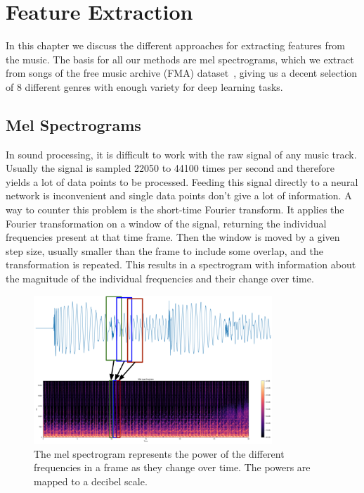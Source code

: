 \chapter{Feature Extraction}\label{ch:extraction}
    In this chapter we discuss the different approaches for extracting features from the music. 
    The basis for all our methods are mel spectrograms, which we extract from songs of the free music archive (FMA) dataset~\cite{FMA}, giving us a decent selection of 8 different genres with enough variety for deep learning tasks.

\section{Mel Spectrograms}
    In sound processing, it is difficult to work with the raw signal of any music track.
    Usually the signal is sampled 22050 to 44100 times per second and therefore yields a lot of data points to be processed. 
    Feeding this signal directly to a neural network is inconvenient and single data points don't give a lot of information.
    A way to counter this problem is the short-time Fourier transform. 
    It applies the Fourier transformation on a window of the signal, returning the individual frequencies present at that time frame. 
    Then the window is moved by a given step size, usually smaller than the frame to include some overlap, and the transformation is repeated.
    This results in a spectrogram with information about the magnitude of the individual frequencies and their change over time.\\
    \begin{figure}[!b]
        \centering
        \includegraphics[width=0.8\textwidth]{images/sigToMels.png}
        \caption{The mel spectrogram represents the power of the different frequencies in a frame as they change over time. The powers are mapped to a decibel scale.}
        \label{mel}
    \end{figure}
